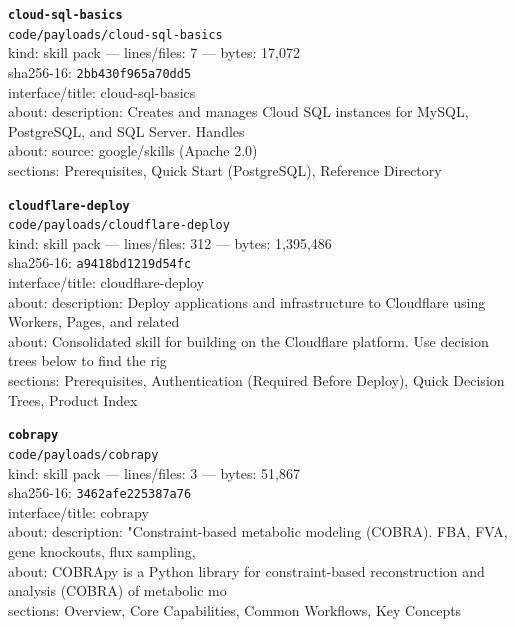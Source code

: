 \noindent\textbf{\texttt{cloud-sql-basics}}\\
\texttt{code/payloads/cloud-sql-basics}\\
kind: skill pack --- lines/files: 7 --- bytes: 17,072\\
sha256-16: \texttt{2bb430f965a70dd5}\\
interface/title: cloud-sql-basics\\
about: description: Creates and manages Cloud SQL instances for MySQL, PostgreSQL, and SQL Server. Handles \\
about: source: google/skills (Apache 2.0)\\
sections: Prerequisites, Quick Start (PostgreSQL), Reference Directory\\
\vspace*{6.0pt}

\noindent\textbf{\texttt{cloudflare-deploy}}\\
\texttt{code/payloads/cloudflare-deploy}\\
kind: skill pack --- lines/files: 312 --- bytes: 1,395,486\\
sha256-16: \texttt{a9418bd1219d54fc}\\
interface/title: cloudflare-deploy\\
about: description: Deploy applications and infrastructure to Cloudflare using Workers, Pages, and related \\
about: Consolidated skill for building on the Cloudflare platform. Use decision trees below to find the rig\\
sections: Prerequisites, Authentication (Required Before Deploy), Quick Decision Trees, Product Index\\
\vspace*{6.0pt}

\noindent\textbf{\texttt{cobrapy}}\\
\texttt{code/payloads/cobrapy}\\
kind: skill pack --- lines/files: 3 --- bytes: 51,867\\
sha256-16: \texttt{3462afe225387a76}\\
interface/title: cobrapy\\
about: description: "Constraint-based metabolic modeling (COBRA). FBA, FVA, gene knockouts, flux sampling, \\
about: COBRApy is a Python library for constraint-based reconstruction and analysis (COBRA) of metabolic mo\\
sections: Overview, Core Capabilities, Common Workflows, Key Concepts\\
\vspace*{6.0pt}
\newpage

